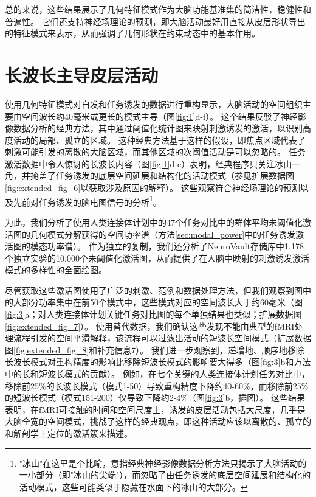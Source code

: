 \documentclass[lang=cn,a4paper,newtx]{elegantpaper}
\begin{document}
总的来说，这些结果展示了几何特征模式作为大脑功能基准集的简洁性，稳健性和普遍性。
它们还支持神经场理论的预测，即大脑活动最好用直接从皮层形状导出的特征模式来表示，从而强调了几何形状在约束动态中的基本作用。




\section{长波长主导皮层活动}

使用几何特征模式对自发和任务诱发的数据进行重构显示，大脑活动的空间组织主要由空间波长约40毫米或更长的模式主导（图\ref{fig:1}d-f）。
这个结果反驳了神经影像数据分析的经典方法，其中通过阈值化统计图来映射刺激诱发的激活，以识别高度活动的局部、孤立的区域。
这种经典方法基于这样的假设，即焦点区域代表了刺激可能引发的离散的大脑区域，而其他区域的次阈值活动是可以忽略的。
任务激活数据中令人惊讶的长波长内容（图\ref{fig:1}d-e）表明，经典程序只关注冰山一角，并掩盖了任务诱发的底层空间延展和结构化的活动模式（参见扩展数据图\ref{fig:extended_fig_6}以获取涉及原因的解释）。
这些观察符合神经场理论的预测以及先前对任务诱发的脑电图信号的分析\footnote{"冰山"在这里是个比喻，意指经典神经影像数据分析方法只揭示了大脑活动的一小部分（即"冰山的尖端"），而忽略了由任务诱发的底层空间延展和结构化的活动模式，这些可能类似于隐藏在水面下的冰山的大部分。}。


为此，我们分析了使用人类连接体计划中的47个任务对比中的群体平均未阈值化激活图的几何模式分解获得的空间功率谱（方法\ref{sec:modal_power}中的任务诱发激活图的模态功率谱）。
作为独立的复制，我们还分析了NeuroVault存储库中1,178个独立实验的10,000个未阈值化激活图，从而提供了在人脑中映射的刺激诱发激活模式的多样性的全面绘图。


尽管获取这些激活图使用了广泛的刺激、范例和数据处理方法，但我们观察到图中的大部分功率集中在前50个模式中，这些模式对应的空间波长大于约60毫米（图\ref{fig:3}a；对人类连接体计划关键任务对比图的每个单独结果也类似；扩展数据图\ref{fig:extended_fig_7}）。
使用替代数据，我们确认这些发现不能由典型的fMRI处理流程引发的空间平滑解释，该流程可以过滤出活动的短波长空间模式（扩展数据图\ref{fig:extended_fig_8}和补充信息7）。
我们进一步观察到，递增地、顺序地移除长波长模式对重构精度的影响比移除短波长模式的影响要大得多（图\ref{fig:3}b和方法中的长和短波长模式的贡献）。
例如，在七个关键的人类连接体计划任务对比中，移除前25\%的长波长模式（模式1-50）导致重构精度下降约40-60\%，而移除前25\%的短波长模式（模式151-200）仅导致下降约2-4\%（图\ref{fig:3}b，插图）。
这些结果表明，在fMRI可接触的时间和空间尺度上，诱发的皮层活动包括大尺度，几乎是大脑全宽的空间模式，挑战了这样的经典观点，即这种活动应该以离散的、孤立的和解剖学上定位的激活簇来描述。
\end{document}
